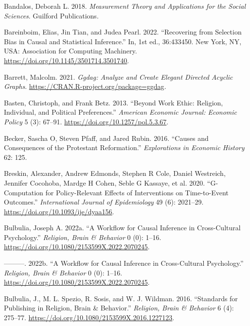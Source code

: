 \documentclass[
  singlecolumn]{report}
\newlength{\cslhangindent}
\newlength{\cslentryspacingunit} %
\newenvironment{CSLReferences}[2] %
 {%
  \setlength{\parindent}{0pt}
  \ifodd #1
  \let\oldpar\par
  \def\par{\hangindent=\cslhangindent\oldpar}
  \fi
  \setlength{\parskip}{#2\cslentryspacingunit}
 }%
 {}
\begin{document}
\hypertarget{refs}{}
\begin{CSLReferences}{1}{0}
\leavevmode{}%
Bandalos, Deborah L. 2018. \emph{Measurement Theory and Applications for
the Social Sciences}. Guilford Publications.

\leavevmode{}%
Bareinboim, Elias, Jin Tian, and Judea Pearl. 2022. {``Recovering from
Selection Bias in Causal and Statistical Inference.''} In, 1st ed.,
36:433450. New York, NY, USA: Association for Computing Machinery.
\url{https://doi.org/10.1145/3501714.3501740}.

\leavevmode{}%
Barrett, Malcolm. 2021. \emph{Ggdag: Analyze and Create Elegant Directed
Acyclic Graphs}. \url{https://CRAN.R-project.org/package=ggdag}.

\leavevmode{}%
Basten, Christoph, and Frank Betz. 2013. {``Beyond Work Ethic: Religion,
Individual, and Political Preferences.''} \emph{American Economic
Journal: Economic Policy} 5 (3): 67--91.
\url{https://doi.org/10.1257/pol.5.3.67}.

\leavevmode{}%
Becker, Sascha O, Steven Pfaff, and Jared Rubin. 2016. {``Causes and
Consequences of the Protestant Reformation.''} \emph{Explorations in
Economic History} 62: 125.

\leavevmode{}%
Breskin, Alexander, Andrew Edmonds, Stephen R Cole, Daniel Westreich,
Jennifer Cocohoba, Mardge H Cohen, Seble G Kassaye, et al. 2020.
{``G-Computation for Policy-Relevant Effects of Interventions on
Time-to-Event Outcomes.''} \emph{International Journal of Epidemiology}
49 (6): 2021--29. \url{https://doi.org/10.1093/ije/dyaa156}.

\leavevmode{}%
Bulbulia, Joseph A. 2022a. {``A Workflow for Causal Inference in
Cross-Cultural Psychology.''} \emph{Religion, Brain \& Behavior} 0 (0):
1--16. \url{https://doi.org/10.1080/2153599X.2022.2070245}.

\leavevmode{}%
---------. 2022b. {``A Workflow for Causal Inference in Cross-Cultural
Psychology.''} \emph{Religion, Brain \& Behavior} 0 (0): 1--16.
\url{https://doi.org/10.1080/2153599X.2022.2070245}.

\leavevmode{}%
Bulbulia, J., M. L. Spezio, R. Sosis, and W. J. Wildman. 2016.
{``Standards for Publishing in Religion, Brain \& Behavior.''}
\emph{Religion, Brain \& Behavior} 6 (4): 275--77.
\url{https://doi.org/10.1080/2153599X.2016.1227123}.


\end{CSLReferences}
\end{document}
